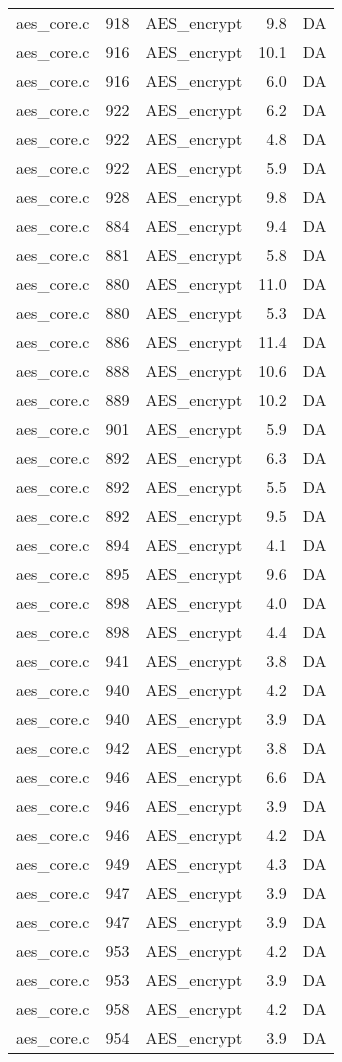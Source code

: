 \begin{table}[!ht]
\begin{tabular}{lrlrr}
aes\_core.c& 918&AES\_encrypt&9.8 &DA\\
aes\_core.c& 916&AES\_encrypt&10.1 &DA\\
aes\_core.c& 916&AES\_encrypt&6.0 &DA\\
aes\_core.c& 922&AES\_encrypt&6.2 &DA\\
aes\_core.c& 922&AES\_encrypt&4.8 &DA\\
aes\_core.c& 922&AES\_encrypt&5.9 &DA\\
aes\_core.c& 928&AES\_encrypt&9.8 &DA\\
aes\_core.c& 884&AES\_encrypt&9.4 &DA\\
aes\_core.c& 881&AES\_encrypt&5.8 &DA\\
aes\_core.c& 880&AES\_encrypt&11.0 &DA\\
aes\_core.c& 880&AES\_encrypt&5.3 &DA\\
aes\_core.c& 886&AES\_encrypt&11.4 &DA\\
aes\_core.c& 888&AES\_encrypt&10.6 &DA\\
aes\_core.c& 889&AES\_encrypt&10.2 &DA\\
aes\_core.c& 901&AES\_encrypt&5.9 &DA\\
aes\_core.c& 892&AES\_encrypt&6.3 &DA\\
aes\_core.c& 892&AES\_encrypt&5.5 &DA\\
aes\_core.c& 892&AES\_encrypt&9.5 &DA\\
aes\_core.c& 894&AES\_encrypt&4.1 &DA\\
aes\_core.c& 895&AES\_encrypt&9.6 &DA\\
aes\_core.c& 898&AES\_encrypt&4.0 &DA\\
aes\_core.c& 898&AES\_encrypt&4.4 &DA\\
aes\_core.c& 941&AES\_encrypt&3.8 &DA\\
aes\_core.c& 940&AES\_encrypt&4.2 &DA\\
aes\_core.c& 940&AES\_encrypt&3.9 &DA\\
aes\_core.c& 942&AES\_encrypt&3.8 &DA\\
aes\_core.c& 946&AES\_encrypt&6.6 &DA\\
aes\_core.c& 946&AES\_encrypt&3.9 &DA\\
aes\_core.c& 946&AES\_encrypt&4.2 &DA\\
aes\_core.c& 949&AES\_encrypt&4.3 &DA\\
aes\_core.c& 947&AES\_encrypt&3.9 &DA\\
aes\_core.c& 947&AES\_encrypt&3.9 &DA\\
aes\_core.c& 953&AES\_encrypt&4.2 &DA\\
aes\_core.c& 953&AES\_encrypt&3.9 &DA\\
aes\_core.c& 958&AES\_encrypt&4.2 &DA\\
aes\_core.c& 954&AES\_encrypt&3.9 &DA\\
\hline
\end{tabular}
\renewcommand{\baselinestretch}{1.0}\selectfont
\end{table}

